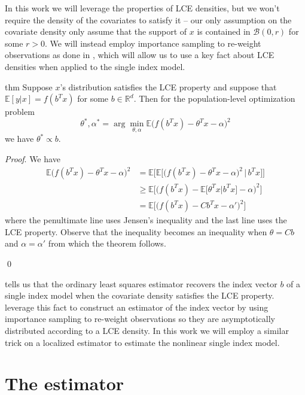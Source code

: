 \documentclass[11pt]{article}
\begin{document}
In this work we will leverage the properties of LCE densities, but we won't require the density of the covariates to satisfy it -- our only assumption on the covariate density only assume that the support of $x$ is contained in $\mathcal{B}(0, r)$ for some $r > 0$. We will instead employ importance sampling to re-weight observations as done in \citet{Newey_Ruud_2005}, which will allow us to use a key fact about LCE densities when applied to the single index model.

\begin{restatable}{thm}{} \label{thm: lce single index}
    Suppose $x$'s distribution satisfies the LCE property and suppose that $\mathbb{E}[y|x] = f(b^{T}x)$ for some $b \in \mathbb{R}^d$. Then for the population-level optimization problem 
    \[\theta^*, \alpha^* = \arg\min_{\theta, \alpha}\mathbb{E}\big(f(b^{T}x) - \theta^{T}x - \alpha\big)^2\]
    we have $\theta^* \propto b$. 
\end{restatable}
\noindent \textit{Proof}. We have 
\begin{align*}
    \mathbb{E}\big(f(b^{T}x) - \theta^{T}x-\alpha\big)^2 &= \mathbb{E}\Big[ \mathbb{E}\Big[\big(f(b^{T}x) - \theta^{T}x-\alpha\big)^2 \, \Big | \, b^{T}x\Big] \Big] \\
    &\geq \mathbb{E}\Big[ \Big(f(b^{T}x) - \mathbb{E}\big[\theta^{T}x |b^{T}x\big]-\alpha\Big)^2 \Big] \\
    &= \mathbb{E}\Big[ \Big(f(b^{T}x) - Cb^{T}x-\alpha'\Big)^2 \Big]
\end{align*}
where the penultimate line uses Jensen's inequality and the last line uses the LCE property. Observe that the inequality becomes an inequality when $\theta = Cb$ and $\alpha = \alpha'$ from which the theorem follows. 

\qed{}

 tells us that the ordinary least squares estimator recovers the index vector $b$ of a single index model when the covariate density satisfies the LCE property. \citet{Newey_Ruud_2005} leverage this fact to construct an estimator of the index vector by using importance sampling to re-weight observations so they are asymptotically distributed according to a LCE density. In this work we will employ a similar trick on a localized estimator to estimate the nonlinear single index model. 

\section{The estimator}
\end{document}
